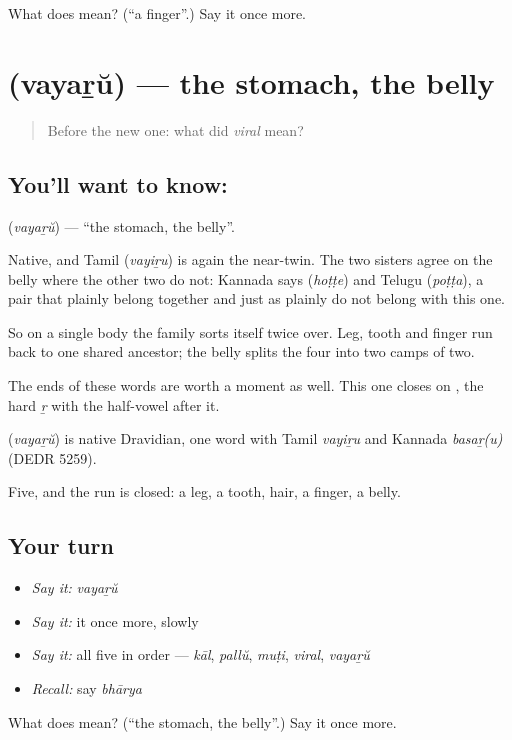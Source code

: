 \begin{tcolorbox}[breakable,colback=teal!4,colframe=teal!35!black,title={Before you move on}]
What does  mean? (\textquotedblleft{}a finger\textquotedblright{}.) Say it once more.
\end{tcolorbox}
\section[\texorpdfstring{\ml{വയറ്} (vayaṟŭ)}{വയറ് (vayaṟŭ)}]{ (vayaṟŭ) — the stomach, the belly}

\label{lesson:ML-C47-stomach}



\begin{quote}
Before the new one: what did \emph{viral} mean?
\end{quote}

\subsection*{You'll want to know: }
\textbf{} (\emph{vayaṟŭ}) — \textquotedblleft{}the stomach, the belly\textquotedblright{}.

Native, and Tamil  (\emph{vayiṟu}) is again the near-twin. The two sisters agree on the belly where the other two do not: Kannada says  (\emph{hoṭṭe}) and Telugu  (\emph{poṭṭa}), a pair that plainly belong together and just as plainly do not belong with this one.

So on a single body the family sorts itself twice over. Leg, tooth and finger run back to one shared ancestor; the belly splits the four into two camps of two.

The ends of these words are worth a moment as well. This one closes on  , the hard \emph{ṟ} with the half-vowel after it.

\begin{cousinweb}
\textbf{} (\emph{vayaṟŭ}) is native Dravidian, one word with Tamil \emph{vayiṟu} and Kannada \emph{basaṟ(u)} (DEDR 5259).
\end{cousinweb}

\begin{grammarlens}[title={What you've built}]
Five, and the run is closed: a leg, a tooth, hair, a finger, a belly.
\end{grammarlens}

\subsection*{Your turn}
\begin{itemize}
\raggedright
  \item \emph{Say it:} \emph{vayaṟŭ}
  \item \emph{Say it:} it once more, slowly
  \item \emph{Say it:} all five in order — \emph{kāl}, \emph{pallŭ}, \emph{muṭi}, \emph{viral}, \emph{vayaṟŭ}
  \item \emph{Recall:} say \emph{bhārya}
\end{itemize}

\begin{tcolorbox}[breakable,colback=teal!4,colframe=teal!35!black,title={Before you move on}]
What does  mean? (\textquotedblleft{}the stomach, the belly\textquotedblright{}.) Say it once more.
\end{tcolorbox}
